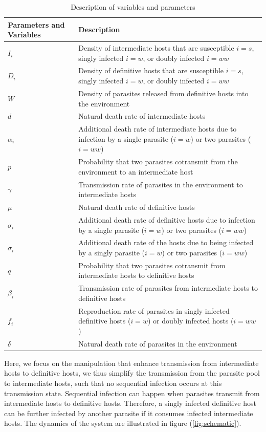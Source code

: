 \documentclass[11pt]{article}
\begin{document}
\begin{table}[!ht]
\begin{tabular}{|p{2.5cm}|p{12cm}|} 
\hline
Parameters and Variables    &  Description  \\
\hline
$I_i$  & Density of intermediate hosts that are susceptible $i=s$, singly infected $i=w$, or doubly infected $i=ww$ \\
\hline
$D_i$ & Density of definitive hosts that are susceptible $i=s$, singly infected $i=w$, or doubly infected $i=ww$ \\
\hline
$W$ & Density of parasites released from definitive hosts into the environment \\
\hline
$d$ & Natural death rate of intermediate hosts \\
\hline
$\alpha_i$ & Additional death rate of intermediate hosts due to infection by a single parasite ($i = w$) or two parasites ($i = ww$) \\
\hline
$p$ & Probability that two parasites cotransmit from the environment to an intermediate host \\
\hline
$\gamma$ & Transmission rate of parasites in the environment to intermediate hosts \\
\hline
$\mu$ & Natural death rate of definitive hosts \\
\hline
$\sigma_i$ & Additional death rate of definitive hosts due to infection by a single parasite ($i = w$) or two parasites ($i = ww$) \\
\hline
$\sigma_i$ & Additional death rate of the hosts due to being infected by a singly parasite ($i = w$) or two parasites ($i = ww$) \\
\hline
$q$ & Probability that two parasites cotransmit from intermediate hosts to definitive hosts \\
\hline
$\beta_i$ & Transmission rate of parasites from intermediate hosts to definitive hosts \\
\hline
$f_i$ & Reproduction rate of parasites in singly infected definitive hosts ($i = w$) or doubly infected hosts ($i = ww$)\\
\hline
$\delta$ & Natural death rate of parasites in the environment \\
\hline
\end{tabular}
\caption{Description of variables and parameters}
\label{table:varpardescription}
\end{table}

Here, we focus on the manipulation that enhance transmission from intermediate hosts to definitive hosts, we thus simplify the transmission from the parasite pool to intermediate hosts, such that no sequential infection occurs at this transmission state. 
Sequential infection can happen when parasites transmit from intermediate hosts to definitive hosts. 
Therefore, a singly infected definitive host can be further infected by another parasite if it consumes infected intermediate hosts. 
The dynamics of the system are illustrated in figure (\ref{fig:schematic}).
\end{document}
